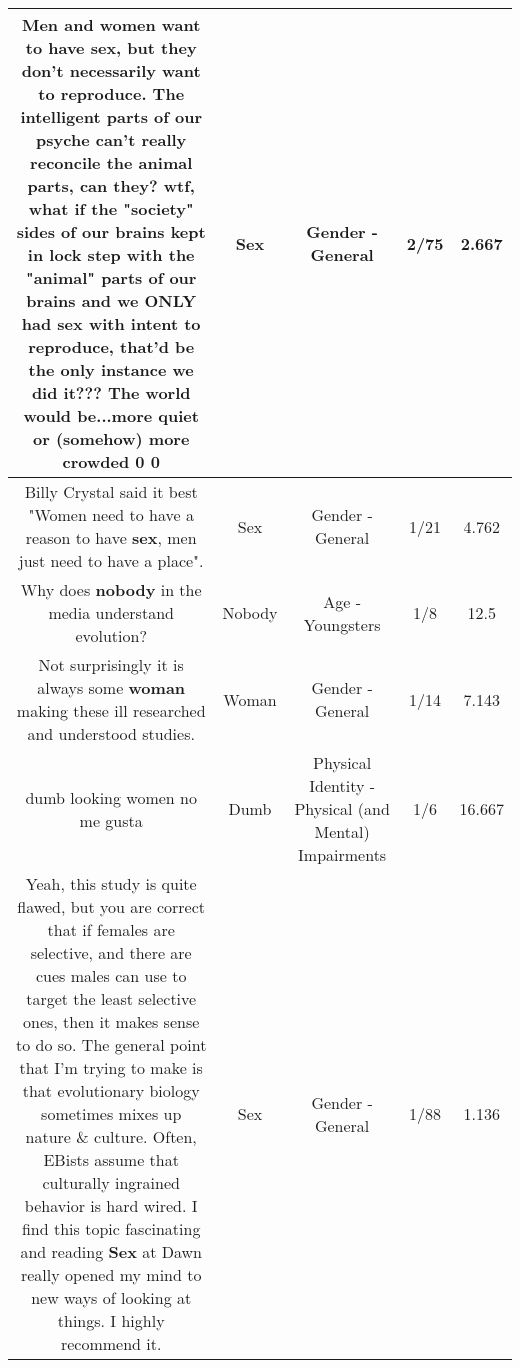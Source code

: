 \documentclass[11pt]{article}
\newlength\mylength
\begin{document}
\begin{center}
\begin{longtable}{|C{.65\mylength}|C{.30\mylength}|C{.12\mylength}|C{.12\mylength}|C{.12\mylength}|}
  \small Men and women want to have \textbf{sex}, but they don't necessarily want to reproduce. The intelligent parts of our psyche can't really reconcile the animal parts, can they? wtf, what if the "society" sides of our brains kept in lock step with the "animal" parts of our brains and we ONLY had \textbf{sex} with intent to reproduce, that'd be the only instance we did it??? The world would be...more quiet or (somehow) more crowded 0 0\normalsize   & Sex & Gender - General & 2/75 & 2.667 \\  \hline
  \small Billy Crystal said it best "Women need to have a reason to have \textbf{sex}, men just need to have a place".\normalsize   & Sex & Gender - General & 1/21 & 4.762 \\  \hline
  \small Why does \textbf{nobody} in the media understand evolution?\normalsize   & Nobody & Age - Youngsters & 1/8 & 12.5 \\  \hline
  \small Not surprisingly it is always some \textbf{woman} making these ill researched and understood studies.\normalsize   & Woman & Gender - General & 1/14 & 7.143 \\  \hline
  \small dumb looking women no me gusta\normalsize   & Dumb & Physical Identity - Physical (and Mental) Impairments & 1/6 & 16.667 \\  \hline
  \small Yeah, this study is quite flawed, but you are correct that if females are selective, and there are cues males can use to target the least selective ones, then it makes sense to do so. The general point that I'm trying to make is that evolutionary biology sometimes mixes up nature \& culture. Often, EBists assume that culturally ingrained behavior is hard wired. I find this topic fascinating and reading \textbf{Sex} at Dawn really opened my mind to new ways of looking at things. I highly recommend it.\normalsize   & Sex & Gender - General & 1/88 & 1.136 \\  \hline

\end{longtable}
\end{center}
\end{document}
